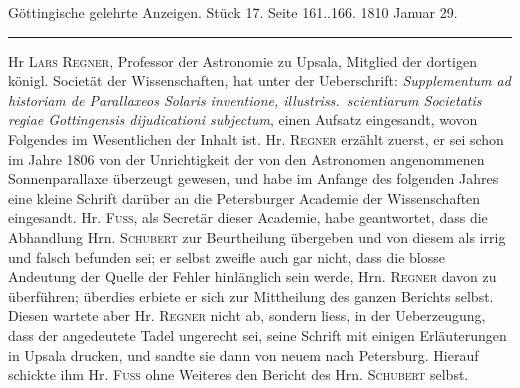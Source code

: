 \clearpage
{}
\begin{center}\small Göttingische gelehrte Anzeigen. Stück 17. Seite 161..166. 1810 Januar 29.\\[3pt]\rule{.72\linewidth}{.3pt}\end{center}

Hr \textsc{Lars Regner}, Professor der Astronomie zu Upsala, Mitglied der dortigen königl. Societät der Wissenschaften, hat unter der Ueberschrift: \emph{Supplementum ad historiam de Parallaxeos Solaris inventione, illustriss.\ scientiarum Societatis regiae Gottingensis dijudicationi subjectum}, einen Aufsatz eingesandt, wovon Folgendes im Wesentlichen der Inhalt ist. Hr. \textsc{Regner} erzählt zuerst, er sei schon im Jahre 1806 von der Unrichtigkeit der von den Astronomen angenommenen Sonnenparallaxe überzeugt gewesen, und habe im Anfange des folgenden Jahres eine kleine Schrift darüber an die Petersburger Academie der Wissenschaften eingesandt. Hr. \textsc{Fuss}, als Secretär dieser Academie, habe geantwortet, dass die Abhandlung Hrn. \textsc{Schubert} zur Beurtheilung übergeben und von diesem als irrig und falsch befunden sei; er selbst zweifle auch gar nicht, dass die blosse Andeutung der Quelle der Fehler hinlänglich sein werde, Hrn. \textsc{Regner} davon zu überführen; überdies erbiete er sich zur Mittheilung des ganzen Berichts selbst. Diesen wartete aber Hr. \textsc{Regner} nicht ab, sondern liess, in der Ueberzeugung, dass der angedeutete Tadel ungerecht sei, seine Schrift mit einigen Erläuterungen in Upsala drucken, und sandte sie dann von neuem nach Petersburg. Hierauf schickte ihm Hr. \textsc{Fuss} ohne Weiteres den Bericht des Hrn. \textsc{Schubert} selbst.

